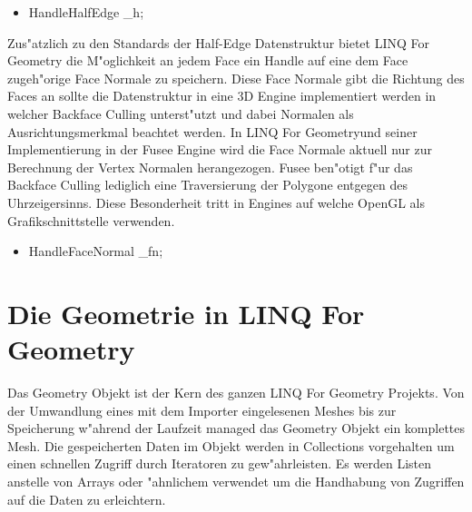 \documentclass[pagesize, paper=a4, fontsize=12pt,titlepage=true, headings=small, headnosepline, abstractoff, liststotoc, nochapterprefix, plainheadsepline]{scrreprt}
\newcommand{\LFG}{LINQ For Geometry}
\newcommand{\LFGS}{LINQ For Geometry }
\newcommand{\HES}{Half-Edge Datenstruktur }
\begin{document}
\begin{itemize}
\item HandleHalfEdge \_h;
\end{itemize}

Zus"atzlich zu den Standards der \HES bietet \LFGS die M"oglichkeit an jedem Face ein Handle auf eine dem Face zugeh"orige Face Normale zu speichern. Diese Face Normale gibt die Richtung des Faces an sollte die Datenstruktur in eine 3D Engine implementiert werden in welcher Backface Culling unterst"utzt und dabei Normalen als Ausrichtungsmerkmal beachtet werden. In \LFG und seiner Implementierung in der Fusee Engine wird die Face Normale aktuell nur zur Berechnung der Vertex Normalen herangezogen. Fusee ben"otigt f"ur das Backface Culling lediglich eine Traversierung der Polygone entgegen des Uhrzeigersinns. Diese Besonderheit tritt in Engines auf welche OpenGL als Grafikschnittstelle verwenden.
\begin{itemize}
\item HandleFaceNormal \_fn;
\end{itemize}
\newpage
	\section {Die Geometrie in \LFG}
			Das Geometry Objekt ist der Kern des ganzen \LFGS Projekts. Von der Umwandlung eines mit dem Importer eingelesenen Meshes bis zur Speicherung w"ahrend der Laufzeit managed das Geometry Objekt ein komplettes Mesh. Die gespeicherten Daten im Objekt werden in Collections vorgehalten um einen schnellen Zugriff durch Iteratoren zu gew"ahrleisten. Es werden Listen anstelle von Arrays oder "ahnlichem verwendet um die Handhabung von Zugriffen auf die Daten zu erleichtern.
\end{document}

